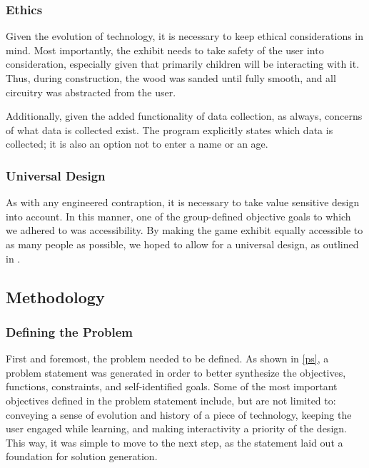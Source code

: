 \documentclass[conference]{IEEEtran}
\begin{document}
\subsubsection{Ethics}

\par Given the evolution of technology, it is necessary to keep ethical considerations in mind. Most importantly, the exhibit needs to take safety of the user into consideration, especially given that primarily children will be interacting with it. Thus, during construction, the wood was sanded until fully smooth, and all circuitry was abstracted from the user.
\par Additionally, given the added functionality of data collection, as always, concerns of what data is collected exist. The program explicitly states which data is collected; it is also an option not to enter a name or an age.

\subsubsection{Universal Design}

\par As with any engineered contraption, it is necessary to take value sensitive design into account. In this manner, one of the group-defined objective goals to which we adhered to was accessibility. By making the game exhibit equally accessible to as many people as possible, we hoped to allow for a universal design, as outlined in \cite{b23}.

\subsection{Methodology}

\subsubsection{Defining the Problem}

\par First and foremost, the problem needed to be defined. As shown in \ref{ps}, a problem statement was generated in order to better synthesize the objectives, functions, constraints, and self-identified goals. Some of the most important objectives defined in the problem statement include, but are not limited to: conveying a sense of evolution and history of a piece of technology, keeping the user engaged while learning, and making interactivity a priority of the design. This way, it was simple to move to the next step, as the statement laid out a foundation for solution generation.
\end{document}
